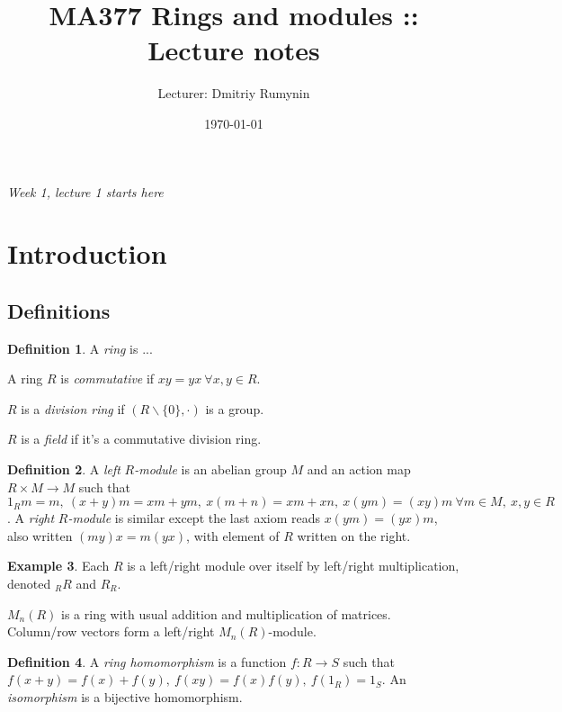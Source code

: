 \documentclass[a4paper]{article}
\title{MA377 Rings and modules :: Lecture notes}
\author{Lecturer: Dmitriy Rumynin}
\date{\today}
\theoremstyle{definition}
\newtheorem{defn}{Definition}[subsection]
\newtheorem{example}[defn]{Example}
\begin{document}
\maketitle
\thispagestyle{empty}

\tableofcontents
\thispagestyle{empty}
\newpage
\setcounter{page}{1}

\begin{flushright}
\textit{Week 1, lecture 1 starts here}
\end{flushright}

\section{Introduction}
\subsection{Definitions}
\begin{defn}
A \textit{ring} is ...

A ring $R$ is \textit{commutative} if $xy=yx \ \forall x,y\in R$.

$R$ is a \textit{division ring} if $(R\backslash\{0\},\cdot)$ is a group.

$R$ is a \textit{field} if it's a commutative division ring.
\end{defn}

\begin{defn}
A \textit{left} $R$\textit{-module} is an abelian group $M$ and an action map $R\times M\rightarrow M$ such that $1_Rm=m,\ (x+y)m=xm+ym,\ x(m+n)=xm+xn,\ x(ym)=(xy)m \ \forall m\in M,\ x,y\in R$. A \textit{right} $R$\textit{-module} is similar except the last axiom reads $x(ym)=(yx)m$, also written $(my)x=m(yx)$, with element of $R$ written on the right.
\end{defn}

\begin{example}
Each $R$ is a left/right module over itself by left/right multiplication, denoted $_R R$ and $R_R$.

$M_n(R)$ is a ring with usual addition and multiplication of matrices. Column/row vectors form a left/right $M_n(R)$-module.
\end{example}

\begin{defn}
A \textit{ring homomorphism} is a function $f:R\rightarrow S$ such that $f(x+y)=f(x)+f(y),\ f(xy)=f(x)f(y),\ f(1_R)=1_S$. An \textit{isomorphism} is a bijective homomorphism.
\end{defn}
\end{document}
